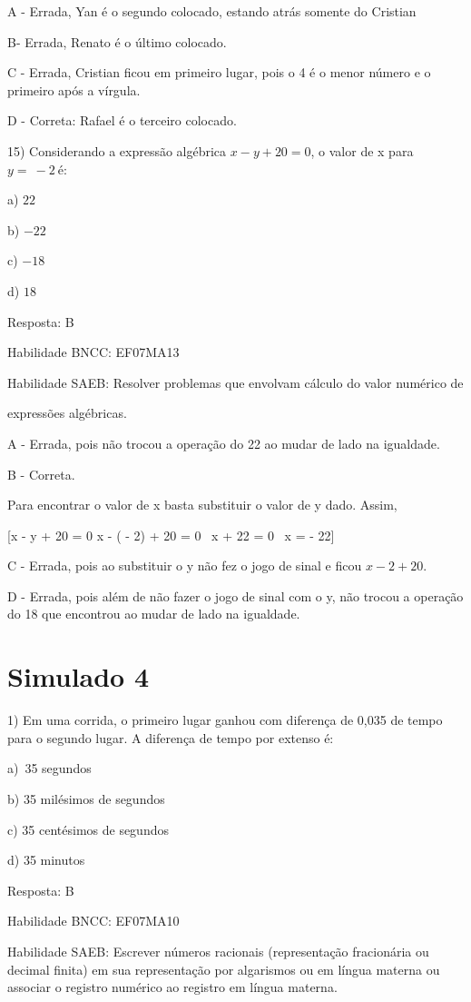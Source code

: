 A - Errada, Yan é o segundo colocado, estando atrás somente do Cristian

B- Errada, Renato é o último colocado.

C - Errada, Cristian ficou em primeiro lugar, pois o 4 é o menor número
e o primeiro após a vírgula.

D - Correta: Rafael é o terceiro colocado.

15) Considerando a expressão algébrica \(x - y + 20 = 0\), o valor de x
para \(y = \  - 2\ \)é:

a) \(22\)

b) \(- 22\)

c) \(- 18\)

d) \(18\)

Resposta: B

Habilidade BNCC: EF07MA13

Habilidade SAEB: Resolver problemas que envolvam cálculo do valor
numérico de

expressões algébricas.

A - Errada, pois não trocou a operação do 22 ao mudar de lado na
igualdade.

B - Correta.

Para encontrar o valor de x basta substituir o valor de y dado. Assim,

[x - y + 20 = 0 \rightarrow x - ( - 2) + 20 = 0 \rightarrow \ x + 22 = 0 \rightarrow \ x = - 22]

C - Errada, pois ao substituir o y não fez o jogo de sinal e ficou
\(x - 2 + 20\).

D - Errada, pois além de não fazer o jogo de sinal com o y, não trocou a
operação do 18 que encontrou ao mudar de lado na igualdade.

\section{Simulado 4}

1) Em uma corrida, o primeiro lugar ganhou com diferença de 0,035 de
tempo para o segundo lugar. A diferença de tempo por extenso é:

a)~35 segundos

b) 35 milésimos de segundos

c) 35 centésimos de segundos~

d) 35 minutos

Resposta: B~

Habilidade BNCC: EF07MA10

Habilidade SAEB: Escrever números racionais (representação fracionária
ou decimal finita) em sua representação por algarismos ou em língua
materna ou associar o registro numérico ao registro em língua materna.

